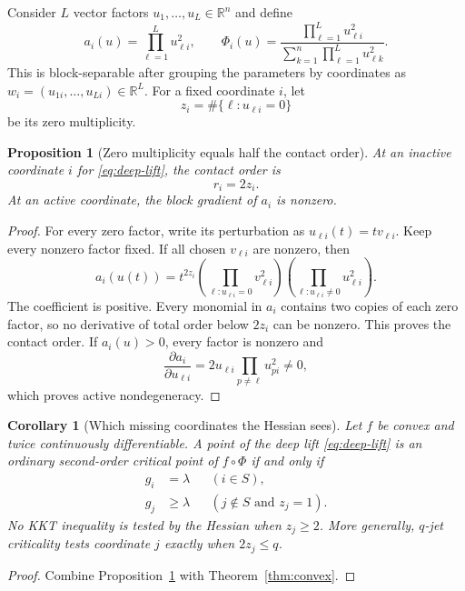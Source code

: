 \documentclass[11pt]{article}
\newtheorem{proposition}[theorem]{Proposition}
\newtheorem{corollary}[theorem]{Corollary}
\theoremstyle{definition}
\theoremstyle{remark}
\newcommand{\R}{\mathbb{R}}
\begin{document}
Consider $L$ vector factors $u_1,\ldots,u_L\in\R^n$ and define
\begin{equation}\label{eq:deep-lift}
  a_i(u)=\prod_{\ell=1}^L u_{\ell i}^2,
  \qquad
  \Phi_i(u)=\frac{\prod_{\ell=1}^L u_{\ell i}^2}
  {\sum_{k=1}^n\prod_{\ell=1}^L u_{\ell k}^2}.
\end{equation}
This is block-separable after grouping the parameters by coordinates as
$w_i=(u_{1i},\ldots,u_{Li})\in\R^L$.
For a fixed coordinate $i$, let
\[
  z_i=\#\{\ell:u_{\ell i}=0\}
\]
be its zero multiplicity.

\begin{proposition}[Zero multiplicity equals half the contact order]
\label{prop:zero-multiplicity}
At an inactive coordinate $i$ for \eqref{eq:deep-lift}, the contact order is
\[
  r_i=2z_i.
\]
At an active coordinate, the block gradient of $a_i$ is nonzero.
\end{proposition}

\begin{proof}
For every zero factor, write its perturbation as $u_{\ell i}(t)=t v_{\ell i}$.
Keep every nonzero factor fixed. If all chosen $v_{\ell i}$ are nonzero, then
\[
  a_i(u(t))
  =t^{2z_i}
   \left(\prod_{\ell:u_{\ell i}=0}v_{\ell i}^2\right)
   \left(\prod_{\ell:u_{\ell i}\ne0}u_{\ell i}^2\right).
\]
The coefficient is positive. Every monomial in $a_i$ contains two copies of
each zero factor, so no derivative of total order below $2z_i$ can be
nonzero. This proves the contact order. If $a_i(u)>0$, every factor is
nonzero and
\[
  \frac{\partial a_i}{\partial u_{\ell i}}
  =2u_{\ell i}\prod_{p\ne\ell}u_{p i}^2\ne0,
\]
which proves active nondegeneracy.
\end{proof}

\begin{corollary}[Which missing coordinates the Hessian sees]
\label{cor:hessian-visibility}
Let $f$ be convex and twice continuously differentiable. A point of the deep
lift \eqref{eq:deep-lift} is an ordinary second-order critical point of
$f\circ\Phi$ if and only if
\begin{align*}
  g_i&=\lambda &&(i\in S),\\
  g_j&\ge\lambda &&(j\notin S\text{ and }z_j=1).
\end{align*}
No KKT inequality is tested by the Hessian when $z_j\ge2$.
More generally, $q$-jet criticality tests coordinate $j$ exactly when
$2z_j\le q$.
\end{corollary}

\begin{proof}
Combine Proposition~\ref{prop:zero-multiplicity} with
Theorem~\ref{thm:convex}.
\end{proof}
\end{document}
